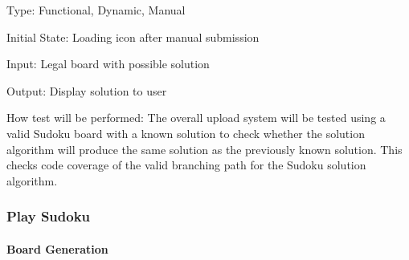 \documentclass[11pt]{article}
\begin{document}
\begin{enumerate}
Type: Functional, Dynamic, Manual
					
Initial State: Loading icon after manual submission
					
Input: Legal board with possible solution
					
Output: Display solution to user
					
How test will be performed: The overall upload system will be tested using a valid Sudoku board with a known solution to check whether the solution algorithm will produce the same solution as the previously known solution. This checks code coverage of the valid branching path for the Sudoku solution algorithm.

\end{enumerate}

\subsubsection{Play Sudoku}

\paragraph{Board Generation}
\end{document}
